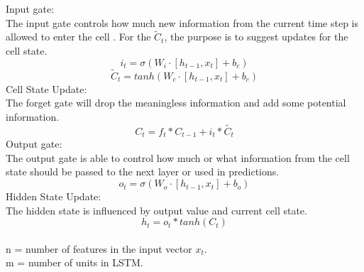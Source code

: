\documentclass[12pt,a4paper]{article}
\begin{document}
Input gate: 
\\[1ex]
The input gate controls how much new information from the current time step is allowed to enter the cell \parencite{hochreiter1997lstm}. For the $\widetilde{C}_t$, the purpose is to suggest updates for the cell state. 
\begin{equation}
    i_t = \sigma( W_i \cdot [ h_{t-1} , x_t ] + b_c ) 
\end{equation}
\begin{equation}
    \widetilde{C}_t = tanh( W_c \cdot [ h_{t-1} , x_t ] + b_c )
\end{equation}
Cell State Update:
\\[1ex]
The forget gate will drop the meaningless information and add some potential information.
\begin{equation}
    C_t = f_t * C_{t-1} + i_t * \widetilde{C_t}
\end{equation}
Output gate:
\\[1ex]
The output gate is able to control how much or what information from the cell state should be passed to the next layer or used in predictions. 
\begin{equation}
    o_t = \sigma( W_o \cdot [ h_{t-1} , x_t ] + b_o )
\end{equation}
Hidden State Update:
\\[1ex]
The hidden state is influenced by output value and current cell state. 
\begin{equation}
    h_t = o_t * tanh(C_t)
\end{equation}
\\[1ex]
n = number of features in the input vector $x_t$.\\
m = number of units in LSTM.\\
\end{document}
